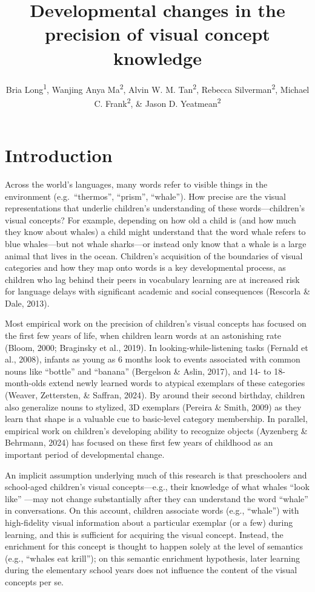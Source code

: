 \documentclass[
  man,mask]{apa6}
\title{Developmental changes in the precision of visual concept knowledge}
\author{Bria Long\textsuperscript{1}, Wanjing Anya Ma\textsuperscript{2}, Alvin W. M. Tan\textsuperscript{2}, Rebecca Silverman\textsuperscript{2}, Michael C. Frank\textsuperscript{2}, \& Jason D. Yeatmean\textsuperscript{2}}
\date{}
\affiliation{\vspace{0.5cm}\textsuperscript{1} University of California San Diego\\\textsuperscript{2} Stanford University}
\begin{document}
\maketitle

\section{Introduction}\label{introduction}

Across the world's languages, many words refer to visible things in the environment (e.g.~``thermos'', ``prism'', ``whale''). How precise are the visual representations that underlie children's understanding of these words---children's visual concepts? For example, depending on how old a child is (and how much they know about whales) a child might understand that the word whale refers to blue whales---but not whale sharks---or instead only know that a whale is a large animal that lives in the ocean. Children's acquisition of the boundaries of visual categories and how they map onto words is a key developmental process, as children who lag behind their peers in vocabulary learning are at increased risk for language delays with significant academic and social consequences (Rescorla \& Dale, 2013).

Most empirical work on the precision of children's visual concepts has focused on the first few years of life, when children learn words at an astonishing rate (Bloom, 2000; Braginsky et al., 2019). In looking-while-listening tasks (Fernald et al., 2008), infants as young as 6 months look to events associated with common nouns like ``bottle'' and ``banana'' (Bergelson \& Aslin, 2017), and 14- to 18-month-olds extend newly learned words to atypical exemplars of these categories (Weaver, Zettersten, \& Saffran, 2024). By around their second birthday, children also generalize nouns to stylized, 3D exemplars (Pereira \& Smith, 2009) as they learn that shape is a valuable cue to basic-level category membership. In parallel, empirical work on children's developing ability to recognize objects (Ayzenberg \& Behrmann, 2024) has focused on these first few years of childhood as an important period of developmental change.

An implicit assumption underlying much of this research is that preschoolers and school-aged children's visual concepts---e.g., their knowledge of what whales ``look like'' ---may not change substantially after they can understand the word ``whale'' in conversations. On this account, children associate words (e.g., ``whale'') with high-fidelity visual information about a particular exemplar (or a few) during learning, and this is sufficient for acquiring the visual concept. Instead, the enrichment for this concept is thought to happen solely at the level of semantics (e.g., ``whales eat krill''); on this semantic enrichment hypothesis, later learning during the elementary school years does not influence the content of the visual concepts per se.
\end{document}
